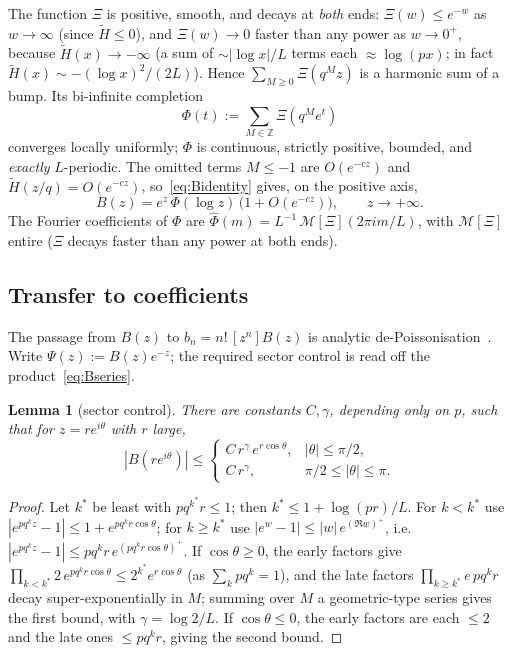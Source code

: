 \documentclass[11pt]{article}
\newtheorem{lemma}[theorem]{Lemma}
\theoremstyle{definition}
\begin{document}
The function $\Xi$ is positive, smooth, and decays at \emph{both}
ends: $\Xi(w)\le e^{-w}$ as $w\to\infty$ (since $\tilde H\le0$), and
$\Xi(w)\to0$ faster than any power as $w\to0^+$, because
$\tilde H(x)\to-\infty$ (a sum of $\sim|\log x|/L$ terms each
$\approx\log(px)$; in fact $\tilde H(x)\sim-(\log x)^2/(2L)$). Hence
$\sum_{M\ge0}\Xi(q^Mz)$ is a harmonic sum of a bump. Its bi-infinite
completion
\begin{equation}\label{eq:Phidef}
  \Phi(t):=\sum_{M\in\mathbb Z}\Xi(q^Me^{t})
\end{equation}
converges locally uniformly; $\Phi$ is continuous, strictly positive,
bounded, and \emph{exactly} $L$-periodic. The omitted terms $M\le-1$
are $O(e^{-cz})$ and $\tilde H(z/q)=O(e^{-cz})$,
so~\eqref{eq:Bidentity} gives, on the positive axis,
\begin{equation}\label{eq:Basymp}
  B(z)=e^{z}\,\Phi(\log z)\,\bigl(1+O(e^{-cz})\bigr),
  \qquad z\to+\infty .
\end{equation}
The Fourier coefficients of $\Phi$ are $\widehat\Phi(m)=
L^{-1}\,\mathcal M[\Xi](2\pi i m/L)$, with $\mathcal M[\Xi]$ entire
($\Xi$ decays faster than any power at both ends).

\subsection{Transfer to coefficients}\label{sec:transfer-coeff}

The passage from $B(z)$ to $b_n=n!\,[z^n]B(z)$ is analytic
de-Poissonisation~\cite{JS}. Write $\Psi(z):=B(z)e^{-z}$; the required
sector control is read off the product~\eqref{eq:Bseries}.

\begin{lemma}[sector control]\label{lem:sector}
  There are constants $C,\gamma$, depending only on $p$, such that for
  $z=re^{i\theta}$ with $r$ large,
  \[
    |B(re^{i\theta})|\le
      \begin{cases}
        C\,r^{\gamma}\,e^{r\cos\theta}, & |\theta|\le\pi/2,\\[2pt]
        C\,r^{\gamma}, & \pi/2\le|\theta|\le\pi .
      \end{cases}
  \]
\end{lemma}

\begin{proof}
  Let $k^\ast$ be least with $pq^{k^\ast}r\le1$; then $k^\ast\le
  1+\log(pr)/L$. For $k<k^\ast$ use $|e^{pq^kz}-1|\le1+e^{pq^kr
  \cos\theta}$; for $k\ge k^\ast$ use $|e^{w}-1|\le|w|\,e^{(\Re w)^+}$,
  i.e.\ $|e^{pq^kz}-1|\le pq^kr\,e^{(pq^kr\cos\theta)^+}$. If
  $\cos\theta\ge0$, the early factors give $\prod_{k<k^\ast}2\,
  e^{pq^kr\cos\theta}\le2^{k^\ast}e^{r\cos\theta}$ (as
  $\sum_kpq^k=1$), and the late factors $\prod_{k\ge k^\ast}e\,pq^kr$
  decay super-exponentially in $M$; summing over $M$ a geometric-type
  series gives the first bound, with $\gamma=\log2/L$. If
  $\cos\theta\le0$, the early factors are each $\le2$ and the late
  ones $\le pq^kr$, giving the second bound.
\end{proof}
\end{document}
